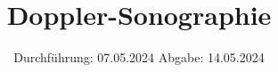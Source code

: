 

\subject{US3}
\title{Doppler-Sonographie}
\date{%
  Durchführung: 07.05.2024
  \hspace{3em}
  Abgabe: 14.05.2024
}



\maketitle
\thispagestyle{empty}
\tableofcontents
\newpage






\printbibliography{}
\appendix
\setcounter{secnumdepth}{0}

